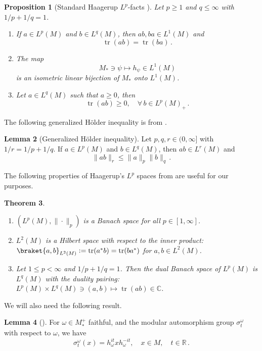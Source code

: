 \documentclass[11pt,a4paper]{article}
\theoremstyle{plain}
\newtheorem{theorem}{Theorem}
\numberwithin{theorem}{section}
\newtheorem{proposition}[theorem]{Proposition}
\theoremstyle{definition}
\newtheorem{lemma}[theorem]{Lemma}
\newcommand{\?}{\overset{?}{=}}
\newcommand{\defeq}{\mathrel{\mathop:}=}
\DeclareMathOperator{\tr}{tr}
\newcommand{\I}{\infty}
\begin{document}
\begin{proposition}[Standard Haagerup \(L^p\)-facts \cite{Terp:1981lp}]
\label{prop:standard-Haagerup-facts}
Let $p\geq1$ and $q\leq\I$ with $1/p+1/q=1$.
    \begin{enumerate}
        \item If $a\in L^p(M)$ and $b\in L^q(M)$, then $ab,ba\in L^1(M)$ and
            \[
                \tr(ab) = \tr(ba)\,.
            \]
        \item  The map
            \begin{equation}
                M_*\ni\psi\mapsto h_\psi\in L^1(M)
            \end{equation}
                is an isometric linear bijection of $M_*$ onto $L^1(M)$.
        \item Let $a\in L^q(M)$ such that $a\geq 0$, then
                \[
                    \tr(ab) \geq0 ,\quad \forall\, b\in L^p(M)_+\,.
                \]
    \end{enumerate}
\end{proposition}
The following generalized H{\"o}lder inequality is from \cite[Theorem 9.17]{Hiai:2021cks}.
\begin{lemma}[Generalized H{\"o}lder inequality]\label{lem:general-holder}
Let $p,q,r\in(0,\I]$ with $1/r=1/p+1/q$. If $a\in L^p(M)$ and $b\in L^q(M)$, then $ab\in L^r(M)$ and
\[
    \|ab\|_r \leq \|a\|_p\|b\|_q\,.
\]
\end{lemma}
The following properties of Haagerup's $L^p$ spaces from \cite{Terp:1981lp} are useful for our purposes.
\begin{theorem}
    \begin{enumerate}
        \item $(L^p(M), \|\cdot\|_p)$ is a Banach space for all $p\in [1,\I]$.
        \item $L^2(M)$ is a Hilbert space with respect to the inner product: $\braket{a,b}_{L^2(M)} \defeq \tr(a^*b)= \tr(ba^*)$ for $a,b\in L^2(M)$.
        \item Let $1\leq p<\I$ and $1/p+1/q=1$. Then the dual Banach space of $L^p(M)$ is $L^q(M)$ with the duality pairing: $L^p(M) \times L^q(M)\ni(a,b) \mapsto \tr(ab) \in \mathbb C$.
    \end{enumerate}
\end{theorem}

We will also need the following result.
\begin{lemma}[\cite{KOSAKI198429}]\label{lem:modularflow-haagerup}
    For $\omega \in M_*^+$ faithful, and the modular automorphism group $\sigma^\omega_t$ with respect to $\omega$, we have
    \begin{equation}
        \sigma^\omega_t(x) = h_\omega^{it}x h_\omega^{-it}, \quad x\in M, \quad t\in \mathbb{R}\,.
    \end{equation}
\end{lemma}
\end{document}
